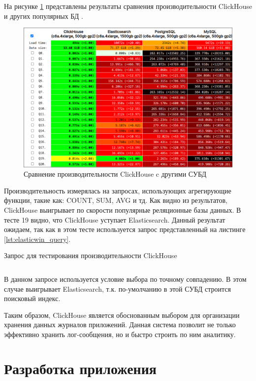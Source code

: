 \documentclass[14pt, russian]{scrartcl}
\begin{document}
На рисунке \ref{fig:clickbench} представлены результаты сравнения производительности ClickHouse и других популярных БД \cite{ClickBench}.


\begin{figure}[H]
	\centering
	\begin{minipage}[t]{.9\textwidth}
		\centering
		\includegraphics[width=.7\textwidth]{./imgs/clickbench.png}
	\end{minipage}
	\caption{Сравнение производительности ClickHouse c другими СУБД}
	\label{fig:clickbench}
\end{figure}

Производительность измерялась на запросах, использующих агрегирующие функции, такие как: COUNT, SUM, AVG и тд. Как видно из результатов, ClickHouse
выигрывает по скорости популярные реляционные базы данных. В тесте 19 видно, что ClickHouse уступает Elasticsearch. Данный результат ожидаем,
так как в этом тесте используется запрос представленный на листинге \ref{lst:elasticwin_query}.

\begin{listing}[H]
	\caption{Запрос для тестирования производительности ClickHouse}
	\label{lst:elasticwin_query}
	\inputminted[style=bw, frame=single,fontsize = \footnotesize, linenos=false, xleftmargin = 1.5em]{SQL}{./listings/elastic_win.sql}
\end{listing}

В данном запросе используется условие выбора по точному совпадению. В этом случае выигрывает Elasticsearch,
т.к. по-умолчанию в этой СУБД строится поисковый индекс.

Таким образом, ClickHouse является обоснованным выбором для
организации хранения данных журналов приложений.
Данная система позволит не только эффективно хранить лог-сообщения, но и быстро строить по ним
аналитику.


\section{Разработка приложения}
\end{document}
